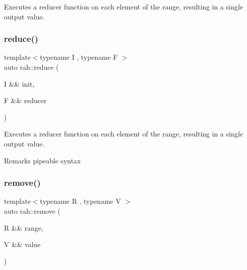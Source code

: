 Executes a reducer function on each element of the range, resulting in a single output value. 


\begin{DoxyCodeInclude}{0}
\end{DoxyCodeInclude}
\mbox{\label{namespacerah_a6a6b7b7e3b78bb4bd16372fbb688c152}} 
\subsubsection{\texorpdfstring{reduce()}{reduce()}\hspace{0.1cm}{\footnotesize\ttfamily [2/2]}}
{\footnotesize\ttfamily template$<$typename I , typename F $>$ \\
auto rah\+::reduce (\begin{DoxyParamCaption}\item[{I \&\&}]{init,  }\item[{F \&\&}]{reducer }\end{DoxyParamCaption})}



Executes a reducer function on each element of the range, resulting in a single output value. 

\begin{DoxyRemark}{Remarks}
pipeable syntax
\end{DoxyRemark}

\begin{DoxyCodeInclude}{0}
\end{DoxyCodeInclude}
\mbox{\label{namespacerah_a17e1a9932fa73843f5431920ebf6cefb}} 
\subsubsection{\texorpdfstring{remove()}{remove()}\hspace{0.1cm}{\footnotesize\ttfamily [1/2]}}
{\footnotesize\ttfamily template$<$typename R , typename V $>$ \\
auto rah\+::remove (\begin{DoxyParamCaption}\item[{R \&\&}]{range,  }\item[{V \&\&}]{value }\end{DoxyParamCaption})}



